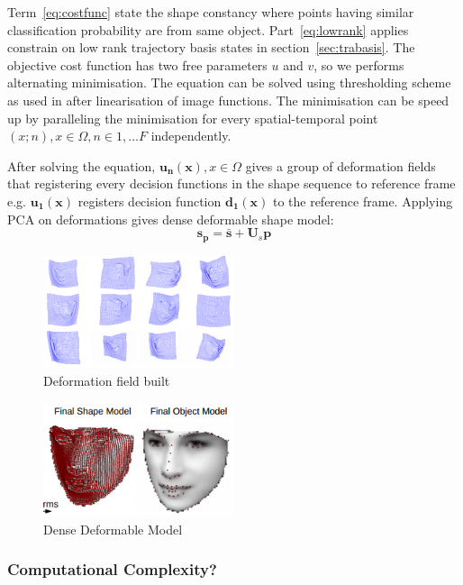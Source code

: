 Term~\eqref{eq:costfunc} state the shape constancy where points having similar classification probability are from same object.
Part~\eqref{eq:lowrank} applies constrain on low rank trajectory basis states in section~\ref{sec:trabasis}.
The objective cost function has two free parameters $u$ and $v$, so we performs alternating minimisation. The equation can be solved using thresholding scheme as used in \cite{?} after linearisation of image functions. The minimisation can be speed up by paralleling the minimisation for every spatial-temporal point $(x;n), x \in \Omega, n \in {1,...F}$ independently.

After solving the equation, $\bm{u_n}(\bm{x}), x \in \Omega$ gives a group of deformation fields that registering every decision functions in the shape sequence to reference frame e.g. $\bm{u_1}(\bm{x})$ registers decision function $\bm{d_1}(\bm{x})$ to the reference frame. Applying PCA on deformations gives dense deformable shape model:
\begin{equation*}
    \bm{s_p}=\bm{\bar{s}} + \bm{U}_s\bm{p}
\end{equation*}

\begin{figure}[h!]
    \centering
        \includegraphics[width=0.5\textwidth]{resources/df}
    \caption{Deformation field built}
    \label{fig:deformationfield}
\end{figure}

\begin{figure}[h!]
    \centering
        \includegraphics[width=0.5\textwidth]{resources/models}
    \caption{Dense Deformable Model}
    \label{fig:models}
\end{figure}


\subsubsection{Computational Complexity?}


\clearpage